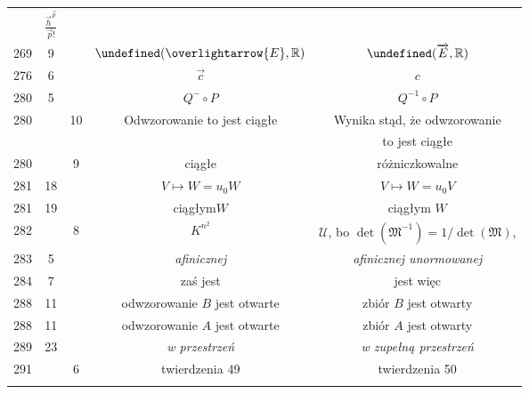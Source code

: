 \documentclass[a4paper]{article}
\newcommand{\mb}{\mathbb}
\newcommand{\R}{\mb{R}}
\let\L\undefined
\newcommand{\L}{\mb{L}}
\newcommand{\fr}{\frac}
\newcommand{\ora}{\overrightarrow}
\newcommand{\ola}{\overlightarrow}
\begin{document}
\begin{center}
\begin{tabular}{|c|c|c|c|c|}
           & $\fr{ \vec{ h }^{ \vec{ p } } }{ \vec{ p }! }$ \\
    269 & 9 & & $\L( \ola{ E }, \R )$
           & $\L( \ora{ E }, \R )$ \\
    276 & 6 & & $\vec{ c }$ & $c$ \\
    280 & 5 & & $Q^{ - } \circ P$ & $Q^{ -1 } \circ P$ \\
    280 & & 10 & Odwzorowanie to jest ciągłe & Wynika stąd,
                                               że odwzorowanie \\
    & & & & to jest ciągłe \\
    280 & & 9 & ciągłe & różniczkowalne \\
    281 & 18 & & $V \mapsto W = u_{ 0 } W$ & $V \mapsto W = u_{ 0 } V$ \\
    281 & 19 & & ciągłym$W$ & ciągłym $W$ \\
    282 & & 8 & $K^{ n^{ 2 } }$
           & $\mathcal{U}$, bo $\det( \mathfrak{M}^{ -1 } )
             = 1/\det( \mathfrak{M} )$, \\
    283 & 5 & & \emph{afinicznej} & \emph{afinicznej unormowanej} \\
    284 & 7 & & zaś jest & jest więc \\
    288 & 11 & & odwzorowanie $B$ jest otwarte & zbiór $B$ jest otwarty \\
    288 & 11 & & odwzorowanie $A$ jest otwarte & zbiór $A$ jest otwarty \\
    289 & 23 & & \emph{w przestrzeń} & \emph{w zupełną przestrzeń} \\
    291 & & 6 & twierdzenia 49 & twierdzenia 50 \\
    & & & & \\ \hline
  \end{tabular}


\end{center}
\end{document}
